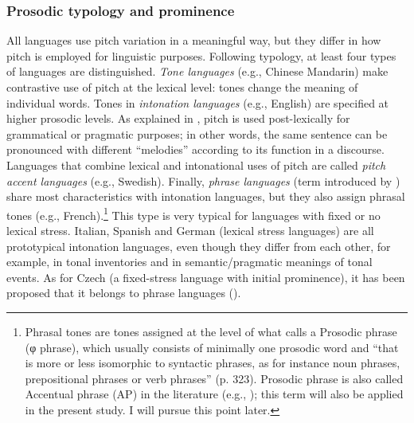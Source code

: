 \subsubsection{Prosodic typology and prominence}\label{sec:2.3.2.1}
\begin{sloppypar}
All languages use pitch variation in a meaningful way, but they differ in how pitch is employed for linguistic purposes. Following  typology, at least four types of languages are distinguished. \textit{Tone languages} (e.g., Chinese Mandarin) make contrastive use of pitch at the lexical level: tones change the meaning of individual words. Tones in \textit{intonation languages} (e.g., English) are specified at higher prosodic levels. As explained in , pitch is used post-lexically for grammatical or pragmatic purposes; in other words, the same sentence can be pronounced with different ``melodies'' according to its function in a discourse. Languages that combine lexical and intonational uses of pitch are called \textit{pitch} \textit{accent languages} (e.g., Swedish). Finally, \textit{phrase languages} (term introduced by \citealt{Féry2010}) share most characteristics with intonation languages, but they also assign phrasal tones (e.g., French).\footnote{Phrasal tones are tones assigned at the level of what \citet{Féry2017} calls a Prosodic phrase (φ phrase), which usually consists of minimally one prosodic word and “that is more or less isomorphic to syntactic phrases, as for instance noun phrases, prepositional phrases or verb phrases” (p. 323). Prosodic phrase is also called Accentual phrase (AP) in the literature (e.g., \citealt{Jun2005, Meisenburg2011}); this term will also be applied in the present study. I will pursue this point later.} This type is very typical for languages with fixed or no lexical stress. Italian, Spanish and German (lexical stress languages) are all prototypical intonation languages, even though they differ from each other, for example, in tonal inventories and in semantic\slash pragmatic meanings of tonal events. As for Czech (a fixed-stress language with initial prominence), it has been proposed that it belongs to phrase languages (\citealt{Pešková2017, PeškováEtAl2018}).
\end{sloppypar}


